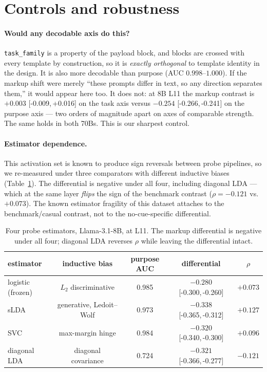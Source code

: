 \documentclass[10pt]{article}
\newcommand{\ci}[2]{{\footnotesize[#1,\,#2]}}
\begin{document}
\section{Controls and robustness}
\label{sec:controls}

\paragraph{Would any decodable axis do this?} \texttt{task\_family} is a property
of the payload block, and blocks are crossed with every template by
construction, so it is \emph{exactly orthogonal} to template identity in the
design. It is also more decodable than purpose (AUC $0.998$--$1.000$). If the
markup shift were merely ``these prompts differ in text, so any direction
separates them,'' it would appear here too. It does not: at 8B L11 the markup
contrast is $+0.003$ \ci{-0.009}{+0.016} on the task axis versus $-0.254$
\ci{-0.266}{-0.241} on the purpose axis --- two orders of magnitude apart on
axes of comparable strength. The same holds in both 70Bs. This is our sharpest
control.

\paragraph{Estimator dependence.} This activation set is known to produce sign
reversals between probe pipelines, so we re-measured under three comparators
with different inductive biases (Table~\ref{tab:est}). The differential is
negative under all four, including diagonal LDA --- which at the same layer
\emph{flips} the sign of the benchmark contrast ($\rho = -0.121$ vs.\ $+0.073$).
The known estimator fragility of this dataset attaches to the benchmark/casual
contrast, not to the no-cue-specific differential.

\begin{table}[h]\centering\small
\caption{Four probe estimators, Llama-3.1-8B, at L11. The markup differential is
negative under all four; diagonal LDA reverses $\rho$ while leaving the
differential intact.}
\label{tab:est}
\begin{tabular}{lcccc}
\toprule
estimator & inductive bias & purpose AUC & differential & $\rho$\\
\midrule
logistic (frozen) & $L_2$ discriminative      & 0.985 & $-0.280$ \ci{-0.300}{-0.260} & $+0.073$\\
sLDA              & generative, Ledoit--Wolf  & 0.973 & $-0.338$ \ci{-0.365}{-0.312} & $+0.127$\\
SVC               & max-margin hinge          & 0.984 & $-0.320$ \ci{-0.340}{-0.300} & $+0.096$\\
diagonal LDA      & diagonal covariance       & 0.724 & $-0.321$ \ci{-0.366}{-0.277} & $\mathbf{-0.121}$\\
\bottomrule
\end{tabular}
\end{table}
\end{document}

